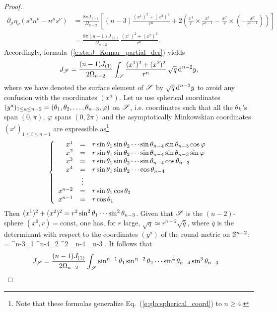 \begin{proof}
\begin{align}
  \partial_\mu \eta_\nu (s^\mu n^\nu - n^\mu s^\nu) & =
   \frac{8\pi J_{(1)}}{\Omega_{n-2}} \left[
   (n-3) \frac{(x^1)^2 + (x^2)^2}{r^n} + 2 \left( \frac{x^1}{r}\times \frac{x^1}{r^{n-1}}
   - \frac{x^2}{r}\times \left(- \frac{x^2}{r^{n-1}} \right) \right) \right] \nonumber \\
   & = \frac{8\pi (n-1) J_{(1)}}{\Omega_{n-2}} \, \frac{(x^1)^2 + (x^2)^2}{r^n} . \nonumber
\end{align}
Accordingly, formula~(\ref{e:sta:J_Komar_partial_der}) yields
\[
    J_{\mathscr{S}} =  \frac{(n-1)J_{(1)}}{2\Omega_{n-2}}  \int_{\mathscr{S}}
    \frac{(x^1)^2 + (x^2)^2}{r^n} \, \sqrt{q}\, \mathrm{d}^{n-2} y ,
\]
where we have denoted the surface element of $\mathscr{S}$ by $\sqrt{q} \, \mathrm{d}^{n-2} y$
to avoid any
confusion with the coordinates $(x^\alpha)$.
Let us use spherical coordinates $(y^a)_{1\leq a \leq n-2} = (\theta_1,\theta_2,\ldots,\theta_{n-3},\varphi)$
on $\mathscr{S}$, i.e. coordinates such that all the $\theta_k$'s span $(0,\pi)$,
$\varphi$ spans $(0,2\pi)$
and the asymptotically Minkowskian coordinates
$(x^i)_{1\leq i \leq n-1}$ are expressible as\footnote{Note that these formulas generalize
Eq.~(\ref{e:glo:spherical_coord}) to $n\geq 4$.}
\[
    \left\{ \begin{array}{rcl}
    x^1 & = & r \sin\theta_1 \sin\theta_2 \cdots \sin \theta_{n-4} \sin \theta_{n-3} \cos\varphi \\
    x^2 & = & r \sin\theta_1 \sin\theta_2 \cdots \sin \theta_{n-4} \sin \theta_{n-3} \sin\varphi \\
    x^3 & = & r \sin\theta_1 \sin\theta_2 \cdots \sin \theta_{n-4} \cos \theta_{n-3} \\
    x^4 & = & r \sin\theta_1 \sin\theta_2 \cdots \cos \theta_{n-4} \\
     &\vdots & \\
    x^{n-2} & = & r \sin\theta_1 \cos\theta_2 \\
    x^{n-1} & = & r \cos\theta _1
     \end{array} \right .
\]
Then $(x^1)^2 + (x^2)^2 = r^2 \sin^2\theta_1 \cdots \sin^2 \theta_{n-3}$.
Given that $\mathscr{S}$ is the $(n-2)$-sphere $(x^0,r) = \mathrm{const}$, one has,
for $r$ large, $\sqrt{q} \simeq r^{n-2} \sqrt{\bar{q}}$,
where $\bar{q}$ is the determinant with respect to the coordinates
$(y^a)$ of the round metric on $\mathbb{S}^{n-2}$:
\be \label{e:sta:sqrt_barq_spher}
  = \sin^{n-3}\th_1 \sin^{n-4}\th_2 \cdots \sin^2 \th_{n-4} \sin \th_{n-3} .
\ee
It follows that
\begin{align}
    J_{\Sp} &=  \frac{(n-1)J_{(1)}}{2\Omega_{n-2}}  \int_{\Sp}
     \sin^{n-1}\th_1 \sin^{n-2}\th_2 \cdots \sin^4 \th_{n-4} \sin^3 \th_{n-3}

\end{align}
\end{proof}
